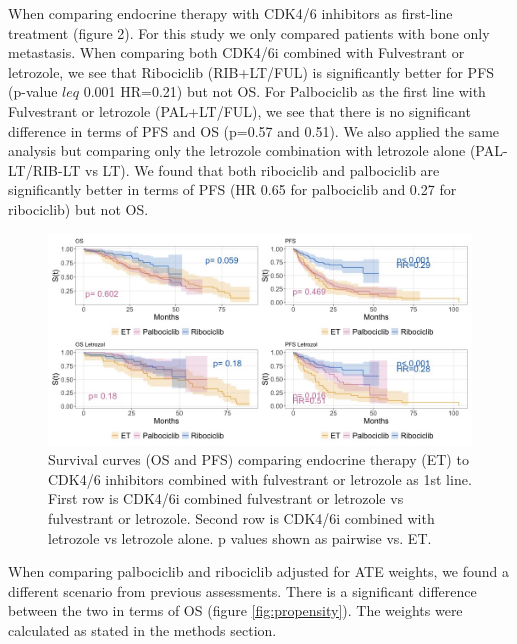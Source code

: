 When comparing endocrine therapy with CDK4/6 inhibitors as first-line treatment (figure 2). For this study we only compared patients with bone only metastasis. When comparing both CDK4/6i combined with Fulvestrant or letrozole, we see that  Ribociclib (RIB+LT/FUL) is significantly better for PFS (p-value $leq$ 0.001 HR=0.21) but not OS. For Palbociclib as the first line with Fulvestrant or letrozole (PAL+LT/FUL), we see that there is no significant difference in terms of PFS and OS (p=0.57 and 0.51). We also applied the same analysis but comparing only the letrozole combination with letrozole alone (PAL-LT/RIB-LT vs LT). We found that both ribociclib and palbociclib are significantly better in terms of PFS (HR 0.65 for palbociclib and 0.27 for ribociclib) but not OS.
\begin{figure}[ht]
  \centering

  \caption{Survival curves (OS and PFS) comparing endocrine therapy (ET) to CDK4/6 inhibitors combined with fulvestrant or letrozole as 1st line. First row is CDK4/6i combined fulvestrant or letrozole vs fulvestrant or letrozole. Second row is CDK4/6i combined with letrozole vs letrozole alone. p values shown as pairwise vs. ET.  }\label{fig:grouped} 
  \includegraphics[scale=0.42]{figures/grouped_curve_both.jpeg}%

\end{figure}

When comparing palbociclib and ribociclib adjusted for ATE weights, we found a different scenario from previous assessments. There is a significant difference between the two in terms of OS (figure \ref*{fig:propensity}). The weights were calculated as stated in the methods section.


